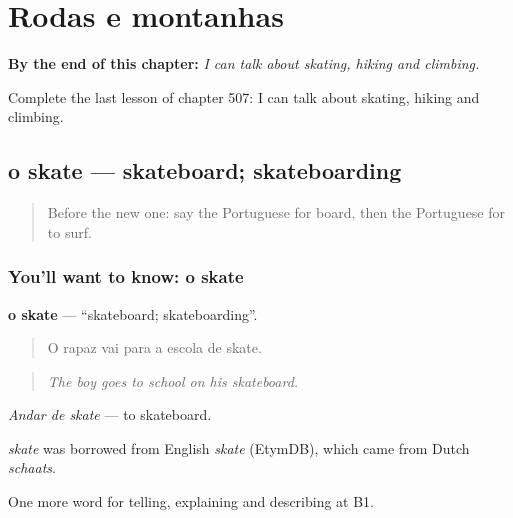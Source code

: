 
\chapter{Rodas e montanhas}
\label{ch:pt-rodas-e-montanhas}

\begin{chapteropening}
\textbf{By the end of this chapter:} \emph{I can talk about skating, hiking and climbing.}

Complete the last lesson of chapter 507: I can talk about skating, hiking and climbing.
\end{chapteropening}

\section[o skate]{o skate — skateboard; skateboarding}

\label{lesson:PT-C507-skate}



\begin{quote}
Before the new one: say the Portuguese for board, then the Portuguese for to surf.
\end{quote}

\subsection*{You'll want to know: o skate}
\textbf{o skate} — \textquotedblleft{}skateboard; skateboarding\textquotedblright{}.

\begin{quote}
O rapaz vai para a escola de skate.
\end{quote}

\begin{quote}
\emph{The boy goes to school on his skateboard.}
\end{quote}

\emph{Andar de skate} — to skateboard.

\begin{cousinweb}
\emph{skate} was borrowed from English \emph{skate} (EtymDB), which came from Dutch \emph{schaats}.
\end{cousinweb}

\begin{grammarlens}[title={What you've built}]
One more word for telling, explaining and describing at B1.
\end{grammarlens}

